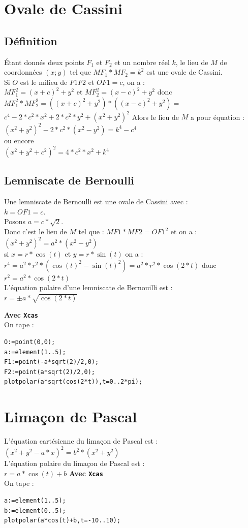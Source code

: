 \documentclass[a4paper,11pt]{book}
\begin{document}
\section{Ovale de Cassini}
\subsection{D\'efinition}
\'Etant donn\'es deux points $F_1$ et $F_2$ et un nombre r\'eel $k$, le lieu 
de $M$ de coordonn\'ees $(x;y)$ tel que $MF_1*MF_2=k^2$ est une ovale de 
Cassini.\\
Si $O$ est le milieu de $F1F2$ et $OF1=c$, on a :\\
$MF_1^2=(x+c)^2+y^2$ et $MF_2^2=(x-c)^2+y^2$ donc\\
$MF_1^2*MF_2^2=((x+c)^2+y^2)*((x-c)^2+y^2)=$\\
$c^4-2*c^2*x^2+2*c^2*y^2+(x^2+y^2)^2$
Alors le lieu de $M$ a pour \'equation : 
$(x^2+y^2)^2-2*c^2*(x^2-y^2)=k^4-c^4$\\
ou encore \\
$(x^2+y^2+c^2)^2=4*c^2*x^2+k^4$\\

\subsection{Lemniscate de Bernoulli}
Une lemniscate de Bernoulli est une ovale de Cassini avec :\\
$k=OF1=c$.\\
Posons $a=c*\sqrt2$.\\
 Donc c'est le lieu de $M$ tel que : $MF1*MF2=OF1^2$ et on a :\\
$(x^2+y^2)^2=a^2*(x^2-y^2)$\\
si 
$x=r*\cos(t)$ et $y=r*\sin(t)$ on a :
$r^4=a^2*r^2*(\cos(t)^2-\sin(t)^2)=a^2*r^2*\cos(2*t)$
donc \\
$r^2=a^2*\cos(2*t)$\\
L'\'equation polaire d'une lemniscate de Bernouilli est :\\
$r=\pm a*\sqrt{\cos(2*t)}$

{\bf Avec {\tt Xcas}}\\
On tape :\\
\begin{verbatim}
O:=point(0,0);
a:=element(1..5);
F1:=point(-a*sqrt(2)/2,0);
F2:=point(a*sqrt(2)/2,0);
plotpolar(a*sqrt(cos(2*t)),t=0..2*pi);
\end{verbatim}

\section{Lima\c{c}on de Pascal}
L'\'equation cart\'esienne du lima\c{c}on de Pascal est :\\
$(x^2+y^2-a*x)^2=b^2*(x^2+y^2)$\\
L'\'equation polaire du lima\c{c}on de Pascal est :\\
$r=a*\cos(t)+b$
{\bf Avec {\tt Xcas}}\\
On tape :\\
\begin{verbatim}
a:=element(1..5);
b:=element(0..5);
plotpolar(a*cos(t)+b,t=-10..10);
\end{verbatim}
\end{document}
